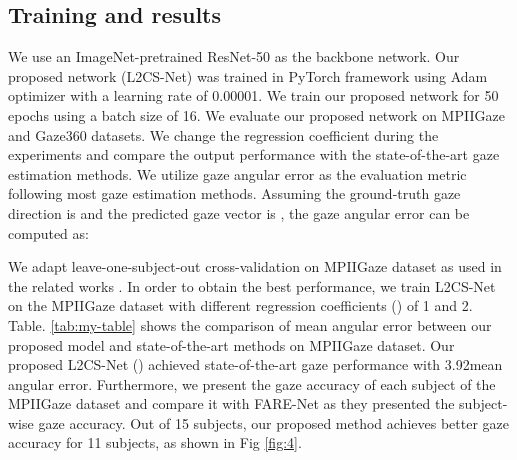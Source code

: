 \documentclass{article}
\begin{document}
\subsection{Training and results}
We use an ImageNet-pretrained ResNet-50 as the backbone network. Our proposed network (L2CS-Net) was trained in PyTorch framework using Adam optimizer with a learning rate of 0.00001. We train our proposed network for 50 epochs using a batch size of 16. We evaluate our proposed network on MPIIGaze and Gaze360 datasets. We change the regression coefficient during the experiments and compare the output performance with the state-of-the-art gaze estimation methods. We utilize gaze angular error  as the evaluation metric following most gaze estimation methods. Assuming the ground-truth gaze direction is      and the predicted gaze vector is     , the gaze angular error   can be computed as:




We adapt leave-one-subject-out cross-validation on MPIIGaze dataset as used in the related works \cite{Mpiigaze1,ca-net,cvpr2021}. In order to obtain the best performance, we train L2CS-Net on the MPIIGaze dataset with different regression coefficients () of 1 and 2. Table. \ref{tab:my-table} shows the comparison of mean angular error between our proposed model and state-of-the-art methods on MPIIGaze dataset. Our proposed L2CS-Net () achieved state-of-the-art gaze performance with 3.92\degree mean angular error. Furthermore, we present the gaze accuracy of each subject of the MPIIGaze dataset and compare it with FARE-Net \cite{farenet} as they presented the subject-wise gaze accuracy. Out of 15 subjects, our proposed method achieves better gaze accuracy for 11 subjects, as shown in Fig \ref{fig:4}. 
\end{document}
